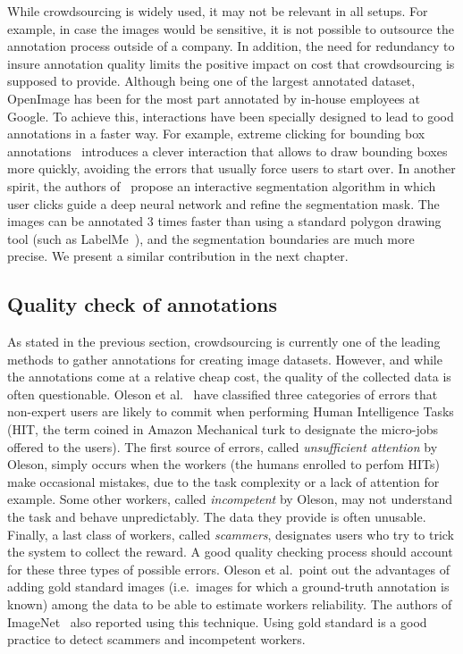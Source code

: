 While crowdsourcing is widely used, it may not be relevant in all setups.
For example, in case the images would be sensitive,
it is not possible to outsource the annotation process outside of a company.
In addition, the need for redundancy to insure annotation quality
limits the positive impact on cost that crowdsourcing is supposed to provide.
Although being one of the largest annotated dataset,
OpenImage has been for the most part annotated by in-house employees at Google.
To achieve this, interactions have been specially designed to lead
to good annotations in a faster way.
For example, extreme clicking for bounding box annotations~\cite{papadopoulos2017extreme}
introduces a clever interaction that allows to draw bounding boxes more quickly,
avoiding the errors that usually force users to start over.
In another spirit, the authors of~\cite{OpenImagesSegmentation}
propose an interactive segmentation algorithm in which user clicks
guide a deep neural network and refine the segmentation mask.
The images can be annotated 3 times faster than
using a standard polygon drawing tool (such as LabelMe~\cite{russell2008labelme}),
and the segmentation boundaries are much more precise.
We present a similar contribution in the next chapter.


\subsection{Quality check of annotations}%
\label{sec:annotation_quality}

As stated in the previous section, crowdsourcing is currently one of
the leading methods to gather annotations for creating image datasets.
However, and while the annotations come at a relative cheap cost,
the quality of the collected data is often questionable.
Oleson et al.~\cite{oleson2011programmatic} have classified
three categories of errors that non-expert users are likely to commit
when performing Human Intelligence Tasks
(HIT, the term coined in Amazon Mechanical turk to designate the micro-jobs offered to the users).
The first source of errors, called \textit{unsufficient attention} by Oleson,
simply occurs when the workers (the humans enrolled to perfom HITs)
make occasional mistakes, due to the task complexity or a lack of attention for example.
Some other workers, called \textit{incompetent} by Oleson,
may not understand the task and behave unpredictably.
The data they provide is often unusable.
Finally, a last class of workers, called \textit{scammers},
designates users who try to trick the system to collect the reward.
A good quality checking process should account for these three types of possible errors.
Oleson et al.\ point out the advantages of adding gold standard images
(i.e.\ images for which a ground-truth annotation is known)
among the data to be able to estimate workers reliability.
The authors of ImageNet~\cite{ILSVRC15} also reported using this technique.
Using gold standard is a good practice to detect scammers and incompetent workers.

